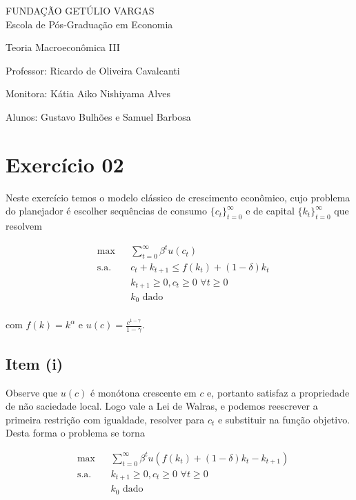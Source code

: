\documentclass{article}
\begin{document}
\begin{flushleft}
FUNDAÇÃO GETÚLIO VARGAS \\

Escola de Pós-Graduação em Economia

Teoria Macroeconômica III

Professor: Ricardo de Oliveira Cavalcanti

Monitora: Kátia Aiko Nishiyama Alves

Alunos: Gustavo Bulhões e Samuel Barbosa
\end{flushleft}

\section*{Exercício 02}

Neste exercício temos o modelo clássico de crescimento econômico, cujo problema do planejador
é escolher sequências de consumo $\{c_t\}_{t=0}^{\infty}$ e de capital $\{k_t\}_{t=0}^{\infty}$ que resolvem

\begin{equation}
\begin{aligned}
& \max & & \sum_{t=0}^{\infty} \beta^t u(c_t) \\
& \text{s.a.} & &  c_t + k_{t+1} \leq f(k_t) + (1-\delta) k_t \\
& & &  k_{t+1} \geq 0, c_t \geq 0 \,\, \forall t \geq 0  \\
& & &  k_0 \text{ dado} \\
\end{aligned}
\end{equation}

com $f(k) = k^\alpha$ e $u(c) = \frac{c^{1-\gamma}}{1-\gamma}$.


\subsection*{Item (i)}

Observe que $u(c)$ é monótona crescente em $c$ e, portanto satisfaz a propriedade de não saciedade local.
Logo vale a Lei de Walras, e podemos reescrever a primeira restrição com igualdade,
resolver para $c_t$ e substituir na função objetivo. Desta forma o problema se torna 

\begin{equation}
\begin{aligned}
& \max & & \sum_{t=0}^{\infty} \beta^t u(f(k_t) + (1-\delta) k_t - k_{t+1}) \\
& \text{s.a.} & &  k_{t+1} \geq 0, c_t \geq 0 \,\, \forall t \geq 0  \\
& & &  k_0 \text{ dado} \\
\end{aligned}
\end{equation}
\end{document}
